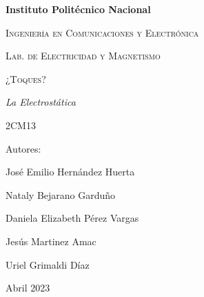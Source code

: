 \documentclass[14pt]{article}
\begin{document}
	\lhead{}
	\begin{titlepage}
		\begin{figure}[t]
			\hspace{0.6\textwidth}
		\end{figure}
		\centering
		{\bfseries\Huge Instituto Politécnico Nacional \par}
		\vspace{1cm}
		{\scshape\Large Ingeniería en Comunicaciones y Electrónica \par}
		\vspace{0.3cm}
		{\scshape\Large Lab. de Electricidad y Magnetismo  \par}
		\vspace{1cm}
		{\scshape\Huge ¿Toques? \par}
		\vspace{1cm}
		{\itshape\Large La Electrostática\par}
		{\Large 2CM13\par}
		\vfill
		{\Large Autores: \par}
		{\Large José Emilio Hernández Huerta \par}
		{\Large Nataly Bejarano Garduño \par}
		{\Large Daniela Elizabeth Pérez Vargas \par}
		{\Large Jesús Martinez Amac\par}
		{\Large Uriel Grimaldi Díaz  \par}
		\vfill
		{\Large Abril 2023 \par}
	\end{titlepage}
	 \tableofcontents
	 
	\newpage
\end{document}
